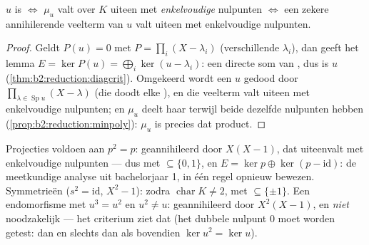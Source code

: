 \begin{corollary}\label{cor:b2:reduction:minpolycrit}
$u$ is  $\iff$ $\mu_u$ valt over $K$ uiteen met
\emph{enkelvoudige} nulpunten $\iff$ een zekere annihilerende
veelterm van $u$ valt uiteen met enkelvoudige nulpunten.
\end{corollary}

\begin{proof}
Geldt $P(u) = 0$ met $P = \prod_{i}(X - \lambda_i)$ (verschillende
$\lambda_i$), dan geeft het lemma $E = \ker P(u) = \bigoplus_i
\ker(u - \lambda_i)$: een directe som van , dus is $u$
 (\cref{thm:b2:reduction:diagcrit}). Omgekeerd
wordt een  $u$ gedood door $\prod_{\lambda \in
\operatorname{Sp}u}(X - \lambda)$ (die doodt elke ), en
die veelterm valt uiteen met enkelvoudige nulpunten; en $\mu_u$
deelt haar terwijl beide dezelfde nulpunten hebben
(\cref{prop:b2:reduction:minpoly}): $\mu_u$ is precies dat product.
\end{proof}

\begin{example}\label{ex:b2:reduction:projections}
Projecties voldoen aan $p^2 = p$: geannihileerd door $X(X-1)$, dat
uiteenvalt met enkelvoudige nulpunten --- dus  met
 $\subseteq \{0, 1\}$, en $E = \ker p \oplus \ker(p -
\mathrm{id})$: de meetkundige analyse uit bachelorjaar 1, in één
regel opnieuw bewezen. Symmetrieën ($s^2 = \mathrm{id}$,
 $X^2 - 1$):  zodra
$\operatorname{char} K \neq 2$, met  $\subseteq \{\pm 1\}$.
Een endomorfisme met $u^3 = u^2$ en $u^2 \neq u$: geannihileerd
door $X^2(X - 1)$, en \emph{niet} noodzakelijk 
--- het criterium ziet dat (het dubbele nulpunt $0$ moet worden
getest:  dan en slechts dan als bovendien $\ker
u^2 = \ker u$).
\end{example}

